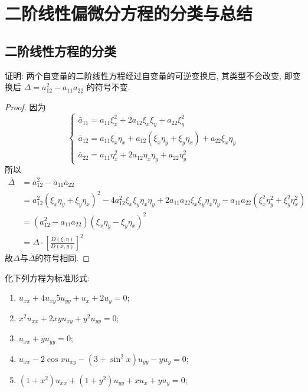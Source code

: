 \chapter{二阶线性偏微分方程的分类与总结}

\section{二阶线性方程的分类}

\begin{exercise}
  证明: 两个自变量的二阶线性方程经过自变量的可逆变换后, 其类型不会改变,
  即变换后 $\Delta = a_{12}^2 - a_{11}a_{22}$ 的符号不变.
\end{exercise}


\begin{proof}
  因为
  \[\begin{cases}
  \bar{a}_{11}=a_{11}\xi_x^2+2a_{12}\xi_x\xi_y+a_{22}\xi_y^2\\
  \bar{a}_{12}=a_{11}\xi_x\eta_x+a_{12}(\xi_x\eta_y+\xi_y\eta_x)+a_{22}\xi_x\eta_y\\
  \bar{a}_{22}=a_{11}\eta_x^2+2a_{12}\eta_x\eta_y+a_{22}\eta_y^2
  \end{cases}\]
  所以
  \[\begin{split}\overline{\Delta}&=\bar{a}_{12}^2-\bar{a}_{11}\bar{a}_{22}\\
  &=a_{12}^2(\xi_x\eta_y+\xi_y\eta_x)^2-4a_{12}^2\xi_x\xi_y\eta_x\eta_y+2a_{11}a_{22}\xi_x\xi_y\eta_x\eta_y-a_{11}a_{22}(\xi_x^2\eta_y^2+\xi_y^2\eta_x^2)\\
  &=(a_{12}^2-a_{11}a_{22})(\xi_x\eta_y-\xi_y\eta_x)^2\\
  &=\Delta\cdot\left[\frac{D(\xi,\eta)}{D(x,y)}\right]^2
  \end{split}\]
  故$\Delta$与$\overline{\Delta}$的符号相同.
\end{proof}


\begin{exercise}[3]
  化下列方程为标准形式:
  \begin{enumerate}[(1)]
    \item $u_{xx} + 4u_{xy} 5u_{yy} + u_x + 2u_y = 0$;
    \item $x^2 u_{xx} + 2xy u_{xy} + y^2 u_{yy} = 0$;
    \item $u_{xx} + yu_{yy} = 0$;
    \item $u_{xx} - 2\cos x u_{xy} - (3 + \sin^2 x)u_{yy} - yu_y = 0$;
    \item $(1+x^2)u_{xx} + (1+y^2)u_{yy} + xu_x + yu_y = 0$;
  \end{enumerate}
\end{exercise}

